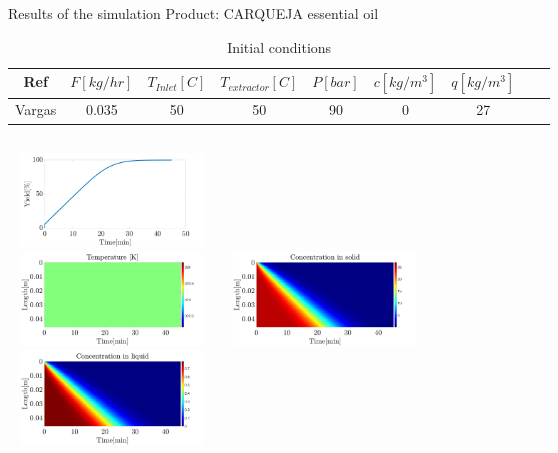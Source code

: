 \documentclass[8pt]{beamer}
\begin{document}
	\begin{frame}[fragile]{Results of the simulation}
	\centering Product: CARQUEJA essential oil
	\begin{table}[!hbt]
		\centering
		\begin{tabular}{ |c|c|c|c|c|c|c|c|c| } 
			\hline
			Ref& $F[kg/hr]$ & $T_{Inlet} [C]$ & $T_{extractor} [C]$ & $P [bar]$ & $c [kg/m^3]$ & $q [kg/m^3]$ \\ \hline
			Vargas & 0.035      & 50              & 50		             & 90  	     & 0 		    & 27 		   \\ \hline
		\end{tabular}
		\caption{Initial conditions}
	\end{table}					
	\begin{columns}[t]
		\centering
		\includegraphics[width=5.5cm,height=2.5cm]{Figures/Sensitivity/Yield.png}\\
		\includegraphics[width=5.5cm,height=2.5cm]{Figures/Sensitivity/Temperature.png}
		\centering
		\includegraphics[width=5.5cm,height=2.5cm]{Figures/Sensitivity/ConcentrationSolid.png}\\
		\includegraphics[width=5.5cm,height=2.5cm]{Figures/Sensitivity/ConcentrationLiquid.png}
	\end{columns}
	\end{frame}
\end{document}
